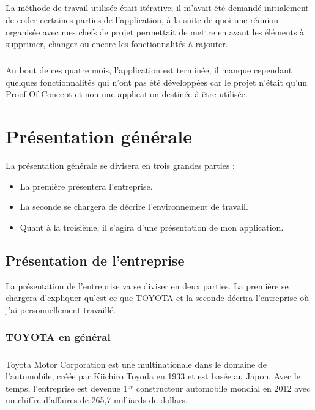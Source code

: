 \documentclass[12pt]{report}
\begin{document}
\paragraph{}
La méthode de travail utilisée était itérative; il m’avait été demandé initialement de coder certaines parties de l’application, à la suite de quoi une réunion organisée avec mes chefs de projet permettait de mettre en avant les éléments à supprimer, changer ou encore les fonctionnalités à rajouter.

\paragraph{}
Au bout de ces quatre mois, l'application est terminée, il manque cependant quelques fonctionnalités qui n'ont pas été développées car le projet n'était qu'un Proof Of Concept et non une application destinée à être utilisée.

\chapter{Présentation générale}
La présentation générale se divisera en trois grandes parties : 

\begin{itemize}
\item La première présentera l'entreprise.
\item La seconde se chargera de décrire l'environnement de travail.
\item Quant à la troisième, il s'agira d'une présentation de mon application.
\end{itemize}

\section{Présentation de l'entreprise}
La présentation de l'entreprise va se diviser en deux parties. La première se chargera d'expliquer qu'est-ce que TOYOTA et la seconde décrira l'entreprise où j'ai personnellement travaillé.
\subsection*{TOYOTA en général}

\paragraph{}
Toyota Motor Corporation est une multinationale dans le domaine de l'automobile, créée par Kiichiro Toyoda en 1933 et est basée au Japon.
Avec le temps, l'entreprise est devenue 1$^{er}$ constructeur automobile mondial en 2012 avec un chiffre d’affaires de 265,7 milliards de dollars.
\end{document}

